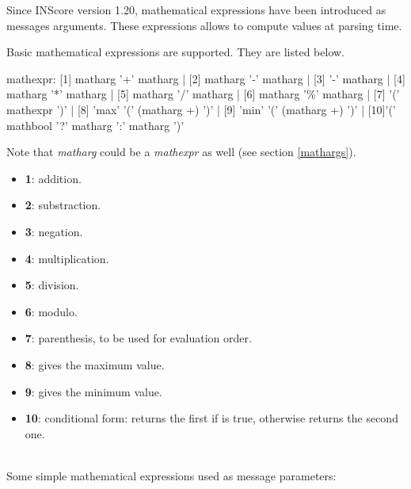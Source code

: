 

\newcommand{\inscoremathversion}{1.20}
\newcommand{\mathstring}[1]		{\textit{string}(\OSC{#1})}
\newcommand{\mathstrnum}[1]		{\textit{length}(\OSC{#1})}
\newcommand{\mathsize}[1]		{\textit{size}(\OSC{#1})}
\newcommand{\op}				{$op$}
\newcommand{\todo}	[1]			{{\big [\texttt{\textbf{#1}}]}}

\label{mathExpr}

Since INScore version \inscoremathversion , mathematical expressions have been introduced as messages arguments. These expressions allows to compute values at parsing time.


Basic mathematical expressions are supported. They are listed below.
\begin{rail}
mathexpr:     [1] matharg '+' matharg
			| [2] matharg '-' matharg
			| [3] '-' matharg
			| [4] matharg '*' matharg
			| [5] matharg '/' matharg
			| [6] matharg '\%' matharg
			| [7] '(' mathexpr ')'
			| [8] 'max' '(' (matharg +) ')'
			| [9] 'min' '(' (matharg +) ')'
			| [10]'(' mathbool '?' matharg ':' matharg ')'
\end{rail}

Note that \textit{matharg} could be a \textit{mathexpr} as well (see section \ref{mathargs}).

\begin{itemize}
\item \textbf{1}: addition.
\item \textbf{2}: substraction.
\item \textbf{3}: negation.
\item \textbf{4}: multiplication.
\item \textbf{5}: division.
\item \textbf{6}: modulo.
\item \textbf{7}: parenthesis, to be used for evaluation order.
\item \textbf{8}: gives the maximum value.
\item \textbf{9}: gives the minimum value.
\item \textbf{10}: conditional form: returns the first  if  is true, otherwise returns the second one.
\end{itemize}

\example\\
Some simple mathematical expressions used as message parameters:

